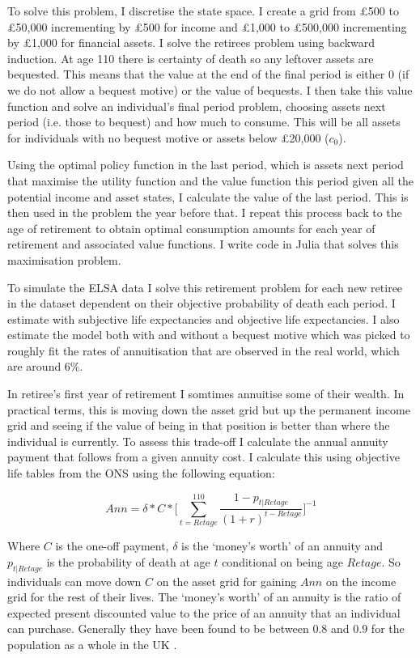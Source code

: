 \documentclass[12pt]{article}
\begin{document}
To solve this problem, I discretise the state space. I create a grid from £500
to £50,000 incrementing by £500 for income and £1,000 to £500,000 incrementing by
£1,000 for financial assets. I solve the retirees problem using backward
induction. At age 110 there is certainty of death so any leftover assets are
bequested. This means that the value at the end of the final period is either 0
(if we do not allow a bequest motive) or the value of bequests. I then take this
value function and solve an individual's final period problem, choosing assets
next period (i.e. those to bequest) and how much to consume. This will be all
assets for individuals with no bequest motive or assets below £20,000 ($c_{0}$).

Using the optimal policy function in the last period, which is assets next
period that maximise the utility function and the value function this period
given all the potential income and asset states, I calculate the value of the
last period. This is then used in the problem the year before that. I repeat
this process back to the age of retirement to obtain optimal consumption amounts
for each year of retirement and associated value functions. I write code in
Julia that solves this maximisation problem.

To simulate the ELSA data I solve this retirement problem for each new retiree
in the dataset dependent on their objective probability of death each period. I
estimate with subjective life expectancies and objective life expectancies. I
also estimate the model both with and without a bequest motive which was picked
to roughly fit the rates of annuitisation that are observed in the real world,
which are around 6\%.

In retiree's first year of retirement I somtimes annuitise some of their wealth.
In practical terms, this is moving down the asset grid but up the permanent
income grid and seeing if the value of being in that position is better than
where the individual is currently. To assess this trade-off I calculate the
annual annuity payment that follows from a given annuity cost. I calculate this
using objective life tables from the ONS using the following equation:

\begin{equation*}
    Ann = \delta * C * \biggl[\sum_{t = Retage}^{110}\frac{1 - p_{t|Retage}}{(1 + r)^{t - Retage}}\biggr]^{-1}
\end{equation*}

Where $C$ is the one-off payment, $\delta$ is the `money's worth' of an annuity
and $p_{t|Retage}$ is the probability of death at age $t$ conditional on being
age $Retage$. So individuals can move down $C$ on the asset grid for gaining $Ann$ on the
income grid for the rest of their lives. The `money's worth' of an annuity is
the ratio of expected present discounted value to the price of an annuity that
an individual can purchase. Generally they have been found to be
between $0.8$ and $0.9$ for the population as a whole in the UK
\citep{finkelstein_porteba_2002, finkelstein_porteba_2004, mitchell_et_al_1999}.
\end{document}
